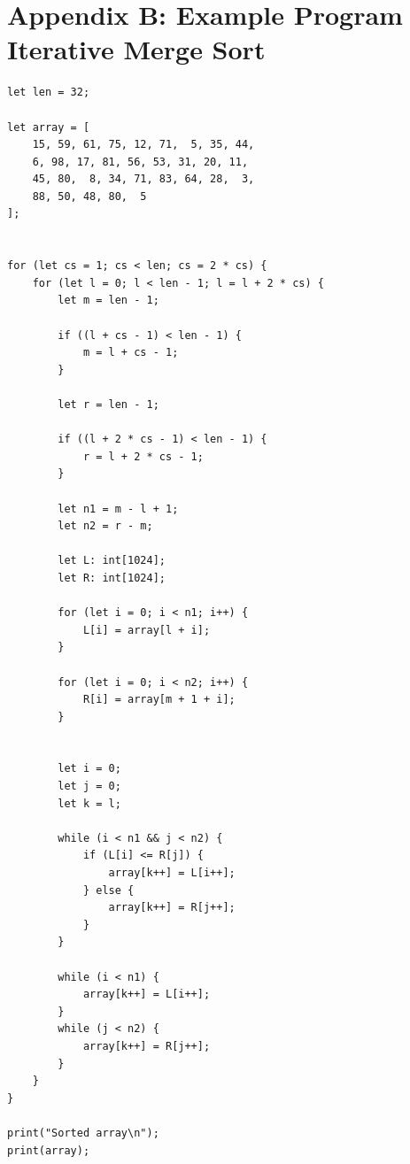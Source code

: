 \documentclass[a4paper]{article}
\begin{document}
\clearpage
\section{Appendix B: Example Program Iterative Merge Sort}
\label{appendix_b}

\begin{lstlisting}[language=DPL]
let len = 32;

let array = [
    15, 59, 61, 75, 12, 71,  5, 35, 44,
    6, 98, 17, 81, 56, 53, 31, 20, 11,
    45, 80,  8, 34, 71, 83, 64, 28,  3,
    88, 50, 48, 80,  5
];


for (let cs = 1; cs < len; cs = 2 * cs) {
    for (let l = 0; l < len - 1; l = l + 2 * cs) {
        let m = len - 1;

        if ((l + cs - 1) < len - 1) {
            m = l + cs - 1;
        }

        let r = len - 1;

        if ((l + 2 * cs - 1) < len - 1) {
            r = l + 2 * cs - 1;
        }

        let n1 = m - l + 1;
        let n2 = r - m;

        let L: int[1024];
        let R: int[1024];

        for (let i = 0; i < n1; i++) {
            L[i] = array[l + i];
        }

        for (let i = 0; i < n2; i++) {
            R[i] = array[m + 1 + i];
        }


        let i = 0;
        let j = 0;
        let k = l;

        while (i < n1 && j < n2) {
            if (L[i] <= R[j]) {
                array[k++] = L[i++];
            } else {
                array[k++] = R[j++];
            }
        }

        while (i < n1) {
            array[k++] = L[i++];
        }
        while (j < n2) {
            array[k++] = R[j++];
        }
    }
}

print("Sorted array\n");
print(array);
\end{lstlisting}


%

%
\end{document}
